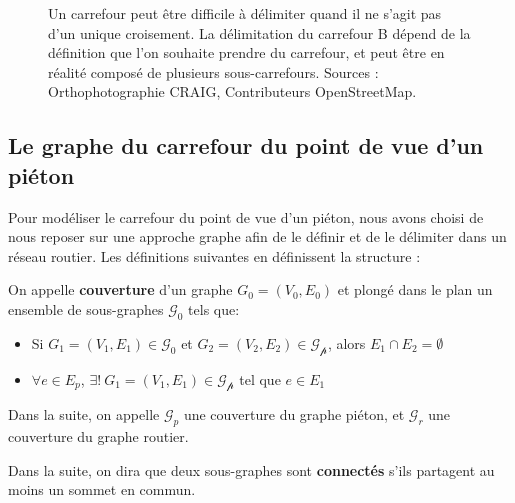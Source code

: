 \begin{figure}
    \centering
    \caption[La délimitation du carrefour]{Un carrefour peut être difficile à délimiter quand il ne s'agit pas d'un unique croisement. La délimitation du carrefour B dépend de la définition que l'on souhaite prendre du carrefour, et peut être en réalité composé de plusieurs sous-carrefours. Sources : Orthophotographie CRAIG, Contributeurs OpenStreetMap.}
    \label{fig:modelisation_simplecomplexe}
\end{figure}


\subsection{Le graphe du carrefour du point de vue d'un piéton}

Pour modéliser le carrefour du point de vue d'un piéton, nous avons choisi de nous reposer sur une approche graphe afin de le définir et de le délimiter dans un réseau routier. Les définitions suivantes en définissent la structure :

\begin{definition}
    On appelle \textbf{couverture} d'un graphe $G_0 = (V_0,E_0)$ et plongé dans le plan un ensemble de sous-graphes $\mathcal{G_0}$ tels que:
    \begin{itemize}
        \item Si $G_1=(V_1, E_1) \in \mathcal{G_0}$ et $G_2=(V_2, E_2) \in \mathcal{G_p}$, alors $E_1 \cap E_2 = \emptyset$
        \item $\forall e \in E_p$, $\exists!~G_1=(V_1, E_1) \in \mathcal{G_p}$ tel que $e \in E_1$
    \end{itemize}
    
    Dans la suite, on appelle $\mathcal{G}_p$ une couverture du graphe piéton, et $\mathcal{G}_r$ une couverture du graphe routier.
    
    Dans la suite, on dira que deux sous-graphes sont \textbf{connectés} s'ils partagent au moins un sommet en commun.
\end{definition}

